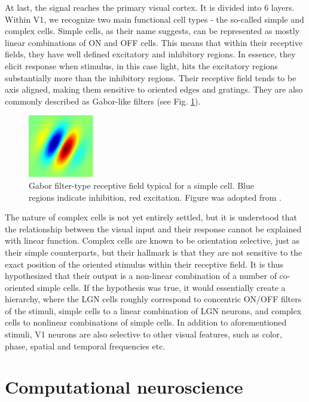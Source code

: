 At last, the signal reaches the primary visual cortex. It is divided into 6 layers. Within V1, we recognize two main functional cell types - the so-called simple and complex cells. Simple cells, as their name suggests, can be represented as mostly linear combinations of ON and OFF cells. This means that within their receptive fields, they have well defined excitatory and inhibitory regions. In essence, they elicit response when stimulus, in this case light, hits the excitatory regions substantially more than the inhibitory regions. Their receptive field tends to be axis aligned, making them sensitive to oriented edges and gratings. They are also commonly described as Gabor-like filters (see Fig. \ref{fig:1.2}). 

\begin{figure}[H]
    \centering
    \includegraphics[width=0.2525\textwidth]{../figures/01_Gabor_filter}
    \caption[Gabor filter-type receptive field typical for a simple cell]{Gabor filter-type receptive field typical for a simple cell. Blue regions indicate inhibition, red excitation. Figure was adopted from \cite{pict_gabor_filter}.}
    \label{fig:1.2}
\end{figure}

The nature of complex cells is not yet entirely settled, but it is understood that the relationship between the visual input and their response cannot be explained with linear function. Complex cells are known to be orientation selective, just as their simple counterparts, but their hallmark is that they are not sensitive to the exact position of the oriented stimulus within their receptive field. It is thus hypothesized that their output is a non-linear combination of a number of co-oriented simple cells. If the hypothesis was true, it would essentially create a hierarchy, where the LGN cells roughly correspond to concentric ON/OFF filters of the stimuli, simple cells to a linear combination of LGN neurons, and complex cells to nonlinear combinations of simple cells. In addition to aforementioned stimuli, V1 neurons are also selective to other visual features, such as color, phase, spatial and temporal frequencies etc.

\section{Computational neuroscience}

